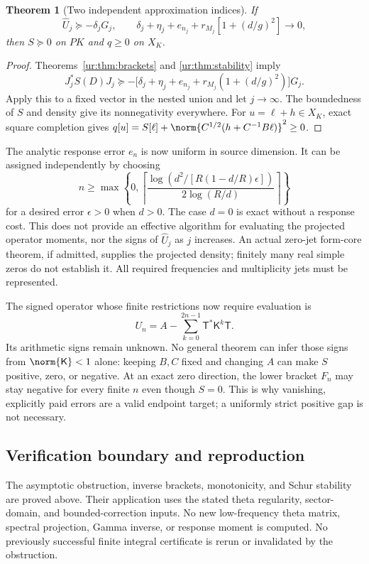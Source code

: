\documentclass[11pt,a4paper]{article}
\numberwithin{equation}{section}
\newtheorem{theorem}{Theorem}[section]
\theoremstyle{definition}\newtheorem{definition}[theorem]{Definition}
\theoremstyle{remark}\newtheorem{remark}[theorem]{Remark}
\begin{document}
\begin{theorem}[Two independent approximation indices]\label{ur:thm:cofinal}
If
\[
 \widehat U_j\succeq-\delta_jG_j,\qquad
 \delta_j+\eta_j+e_{n_j}
 +r_{M_j}[1+(d/g)^2]\longrightarrow0,
\]
then $S\succeq0$ on $PK$ and $q\ge0$ on ${X}_K$.
\end{theorem}
\begin{proof}
Theorems~\ref{ur:thm:brackets} and \ref{ur:thm:stability} imply
\[
 J_j^*S(D)J_j\succeq-
 \bigl[\delta_j+\eta_j+e_{n_j}
           +r_{M_j}(1+(d/g)^2)\bigr]G_j.
\]
Apply this to a fixed vector in the nested union and let $j\to\infty$.
The boundedness of $S$ and density give its nonnegativity everywhere.
For $u=\ell+h\in{X}_K$, exact square completion gives
$q[u]=S[\ell]+\norm{C^{1/2}(h+C^{-1}B\ell)}^2\ge0$.
\end{proof}

The analytic response error $e_n$ is now uniform in source dimension.
It can be assigned independently by choosing
\[
 n\ge\max\left\{0,\left\lceil
 \frac{\log(d^2/[R(1-d/R)\epsilon])}{2\log(R/d)}
 \right\rceil\right\}
\]
for a desired error $\epsilon>0$ when $d>0$. The case $d=0$ is exact
without a response cost. This does not provide an effective algorithm
for evaluating the projected operator moments, nor the signs of
$\widehat U_j$ as $j$ increases. An actual zero-jet form-core theorem,
if admitted, supplies the projected density; finitely many real simple
zeros do not establish it. All required frequencies and multiplicity
jets must be represented.

The signed operator whose finite restrictions now require evaluation is
\[
 U_n=A-\sum_{k=0}^{2n-1}{\mathsf T}^*{\mathsf K}^k{\mathsf T}.
\]
Its arithmetic signs remain unknown. No general theorem can infer those
signs from $\norm{{\mathsf K}}<1$ alone: keeping $B,C$ fixed and changing $A$
can make $S$ positive, zero, or negative. At an exact zero direction,
the lower bracket $F_n$ may stay negative for every finite $n$ even
though $S=0$. This is why vanishing, explicitly paid errors are a valid
endpoint target; a uniformly strict positive gap is not necessary.

\subsection{Verification boundary and reproduction}
The asymptotic obstruction, inverse brackets, monotonicity, and Schur
stability are proved above. Their application uses the stated theta
regularity, sector-domain, and bounded-correction inputs. No new
low-frequency theta matrix, spectral projection, Gamma inverse, or
response moment is computed. No previously successful finite integral
certificate is rerun or invalidated by the obstruction.
\end{document}
